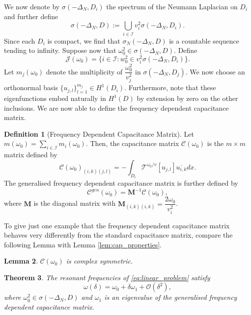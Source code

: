 \documentclass[a4paper,reqno,twoside]{amsart}
\numberwithin{equation}{section}
\newtheorem{theorem}{Theorem}[section]
\newtheorem{lemma}[theorem]{Lemma}
\theoremstyle{definition}
\newtheorem{definition}[theorem]{Definition}
\newcommand{\<}{\ensuremath \leq}
\renewcommand{\>}{\ensuremath \geq}
\begin{document}
We now denote by $\sigma(-\Delta_N,D_i)$ the spectrum of the Neumann Laplacian on $D_i$ and further define
\begin{equation}
    \sigma(-\Delta_N,D) :=\bigcup_{i\in\mathcal{I}}v_i^2\sigma(-\Delta_N,D_i).
\end{equation}
Since each $D_i$ is compact, we find that $\sigma_N(-\Delta_N,D)$ is a countable sequence tending to infinity. Suppose now that $\omega_0^2\in\sigma(-\Delta_N,D)$. Define 
\begin{equation}
    \mathcal{J}(\omega_0) = \{i\in\mathcal{I}: w_0^2\in v_i^2\sigma(-\Delta_N,D_i)\}.
\end{equation}
Let $m_j(\omega_0)$ denote the multiplicity of $\dfrac{\omega_0^2}{v_j^2}$ in $\sigma(-\Delta_N, D_j)$. We now choose an orthonormal basis $\{u_{j,l}\}_{l=1}^{m_j}\in H^1(D_i)$. Furthermore, note that these eigenfunctions embed naturally in $H^1(D)$ by extension by zero on the other inclusions. We are now able to define the frequency dependent capacitance matrix.
\begin{definition}[Frequency Dependent Capacitance Matrix]
    Let $m(\omega_0) = \sum_{i\in\mathcal{I}}m_i(\omega_0)$. Then, the capacitance matrix $\mathcal{C}(\omega_0)$ is the $m\times m$ matrix defined by
    \begin{equation}
        \mathcal{C}(\omega_0)_{(i,k)(j,l)}=-\int_{D_i}\mathcal{T}^{\omega_0/v}[u_{j,l}]\overline{u_{i,k}}dx.
    \end{equation}
    The generalised frequency dependent capacitance matrix is further defined by
    \begin{equation}
        \mathcal{C}^{gen}(\omega_0)=\mathbf{M}^{-1}\mathcal{C}(\omega_0),
    \end{equation}
    where $\mathbf{M}$ is the diagonal matrix with $\mathbf{M}_{(i,k)(i,k)} = \dfrac{2\omega_0}{v_i^2}$.
\end{definition}
To  give just one example that the frequency dependent capacitance matrix behaves very differently from the standard capacitance matrix, compare the following Lemma \cite[Proposition 3.16]{ammari2026frequencydependentcapacitancematrixformulation} with Lemma \ref{lem:cap_properties}.
\begin{lemma}
    $\mathcal{C}(\omega_0)$ is complex symmetric.
\end{lemma}
\begin{theorem}\label{thm:fundamental_highfreq}
    The resonant frequencies of \ref{eq:linear_problem} satisfy
    \begin{equation}
        \omega(\delta) = \omega_0 + \delta \omega_1 +\mathcal{O}(\delta^2),
    \end{equation}
    where $\omega_0^2\in\sigma(-\Delta_N,D)$ and $\omega_1$ is an eigenvalue of the generalised frequency dependent capacitance matrix.
\end{theorem}
\end{document}
